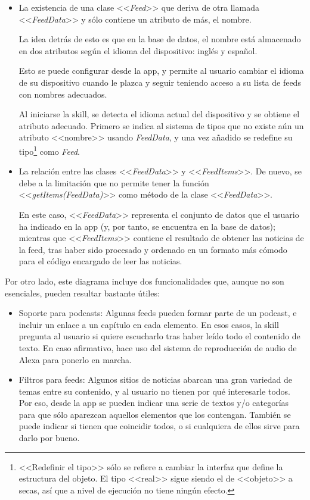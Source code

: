 \documentclass[11pt,spanish,listoffigures,listoftables,table,hyphens,dvipsnames]{tfgetsinf}
\begin{document}
\begin{itemize}
   \item La existencia de una clase <<\emph{Feed}>> que deriva de otra llamada <<\emph{FeedData}>> y sólo contiene un atributo de más, el nombre.
   
   La idea detrás de esto es que en la base de datos, el nombre está almacenado en dos atributos según el idioma del dispositivo: inglés y español.
   
   Esto se puede configurar desde la app, y permite al usuario cambiar el idioma de su dispositivo cuando le plazca y seguir teniendo acceso a su lista de feeds con nombres adecuados.

   Al iniciarse la skill, se detecta el idioma actual del dispositivo y se obtiene el atributo adecuado. Primero se indica al sistema de tipos que no existe aún un atributo <<nombre>> usando \emph{FeedData}, y una vez añadido se redefine su tipo\footnote{<<Redefinir el tipo>> sólo se refiere a cambiar la interfaz que define la estructura del objeto. El tipo <<real>> sigue siendo el de <<objeto>> a secas, así que a nivel de ejecución no tiene ningún efecto.} como \emph{Feed}.

   \item La relación entre las clases <<\emph{FeedData}>> y <<\emph{FeedItems}>>. De nuevo, se debe a la limitación que no permite tener la función <<\emph{getItems(FeedData)}>> como método de la clase <<\emph{FeedData}>>.
   
   En este caso, <<\emph{FeedData}>> representa el conjunto de datos que el usuario ha indicado en la app (y, por tanto, se encuentra en la base de datos); mientras que <<\emph{FeedItems}>> contiene el resultado de obtener las noticias de la feed, tras haber sido procesado y ordenado en un formato más cómodo para el código encargado de leer las noticias.
\end{itemize}

Por otro lado, este diagrama incluye dos funcionalidades que, aunque no son esenciales, pueden resultar bastante útiles:

\begin{itemize}
   \item Soporte para podcasts: Algunas feeds pueden formar parte de un podcast, e incluir un enlace a un capítulo en cada elemento. En esos casos, la skill pregunta al usuario si quiere escucharlo tras haber leído todo el contenido de texto. En caso afirmativo, hace uso del sistema de reproducción de audio de Alexa para ponerlo en marcha.
   \item Filtros para feeds: Algunos sitios de noticias abarcan una gran variedad de temas entre su contenido, y al usuario no tienen por qué interesarle todos. Por eso, desde la app se pueden indicar una serie de textos y/o categorías para que sólo aparezcan aquellos elementos que los contengan. También se puede indicar si tienen que coincidir todos, o si cualquiera de ellos sirve para darlo por bueno.
\end{itemize}
\end{document}
